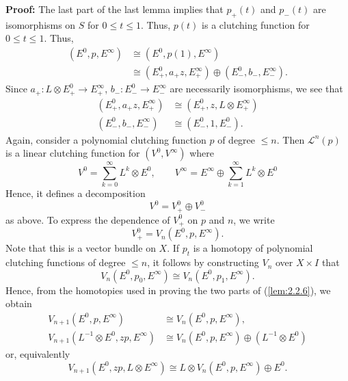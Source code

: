 \textbf{Proof:} The last part of the last lemma implies that $p_+(t)$ and $p_-(t)$ are isomorphisms on $S$ for $0 \leq t \leq 1$. Thus, $p(t)$ is a clutching function for $0 \leq t \leq 1$. Thus,
\begin{align*}
    (E^0, p, E^\infty) &\cong (E^0, p(1), E^\infty) \\
    &\cong (E^0_+, a_+ z, E^\infty_+) \oplus (E^0_-, b_-, E^\infty_-) .
\end{align*}
Since $a_+: L \otimes E^0_+ \to E^\infty_+$, $b_-: E^0_- \to E^\infty_-$ are necessarily isomorphisms, we see that
\begin{align*}
    (E^0_+, a_+ z, E^\infty_+) &\cong (E^0_+, z, L \otimes E^\infty_+) \\
    (E^0_-, b_-, E^\infty_-) &\cong (E^0_-, 1, E^0_-) .
\end{align*}
Again, consider a polynomial clutching function $p$ of degree $\leq n$. Then $\mathcal{L}^n(p)$ is a linear clutching function for $(V^0, V^\infty)$ where
\begin{equation*}
    V^0 = \sum_{k=0}^\infty L^k \otimes E^0, \qquad V^\infty = E^\infty \oplus \sum_{k=1}^\infty L^k \otimes E^0
\end{equation*}
Hence, it defines a decomposition
\begin{equation*}
    V^0 = V^0_+ \oplus V^0_-
\end{equation*}
as above. To express the dependence of $V^0_+$ on $p$ and $n$, we write
\begin{equation*}
    V^0_+ = V_n(E^0, p, E^\infty) .
\end{equation*}
Note that this is a vector bundle on $X$. If $p_t$ is a homotopy of polynomial clutching functions of degree $\leq n$, it follows by constructing $V_n$ over $X \times I$ that
\begin{equation*}
    V_n(E^0, p_0, E^\infty) \cong V_n(E^0, p_1, E^\infty) .
\end{equation*}
Hence, from the homotopies used in proving the two parts of (\ref{lem:2.2.6}), we obtain
\begin{align*}
    V_{n+1}(E^0, p, E^\infty) &\cong V_n(E^0, p, E^\infty), \\
    V_{n+1}(L^{-1} \otimes E^0, zp, E^\infty) &\cong V_n(E^0, p, E^\infty) \oplus (L^{-1} \otimes E^0)
\end{align*}
or, equivalently
\begin{equation*}
    V_{n+1}(E^0, zp, L \otimes E^\infty) \cong L \otimes V_n(E^0, p, E^\infty) \oplus E^0 .
\end{equation*} \par 
